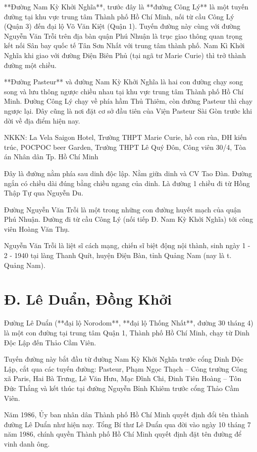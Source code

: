 **Đường Nam Kỳ Khởi Nghĩa**, trước đây là **đường Công Lý** là một tuyến đường tại khu vực trung tâm Thành phố Hồ Chí Minh, nối từ cầu Công Lý (Quận 3) đến đại lộ Võ Văn Kiệt (Quận 1). Tuyến đường này cùng với đường Nguyễn Văn Trỗi trên địa bàn quận Phú Nhuận là trục giao thông quan trọng kết nối Sân bay quốc tế Tân Sơn Nhất với trung tâm thành phố. Nam Kì Khởi Nghĩa khi giao với đường Điện Biên Phủ (tại ngã tư Marie Curie) thì trở thành đường một chiều.

**Đường Pasteur** và đường Nam Kỳ Khởi Nghĩa là hai con đường chạy song song và lưu thông ngược chiều nhau tại khu vực trung tâm Thành phố Hồ Chí Minh. Đường Công Lý chạy về phía hầm Thủ Thiêm, còn đường Pasteur thì chạy ngược lại. Đây cũng là nơi đặt cơ sở đầu tiên của Viện Pasteur Sài Gòn trước khi dời về địa điểm hiện nay.

NKKN: La Vela Saigon Hotel, Trường THPT Marie Curie, hồ con rùa, ĐH kiến trúc, POCPOC beer Garden, Trường THPT Lê Quý Đôn, Công viên 30/4, Tòa án Nhân dân Tp. Hồ Chí Minh

Đây là đường nằm phía sau dinh độc lập. Nằm giữa dinh và CV Tao Đàn. Đường ngắn có chiều dài đúng bằng chiều ngang của dinh. Là đường 1 chiều đi từ Hồng Thập Tự qua Nguyễn Du.

Đường Nguyễn Văn Trỗi là một trong những con đường huyết mạch của quận Phú Nhuận. Đường đi từ cầu Công Lý (nối tiếp Đ. Nam Kỳ Khởi Nghĩa) tới công viên Hoàng Văn Thụ.

Nguyễn Văn Trỗi là liệt sĩ cách mạng, chiến sĩ biệt động nội thành, sinh ngày 1 - 2 - 1940 tại làng Thanh Quít, huyện Điện Bàn, tỉnh Quảng Nam (nay là t. Quảng Nam).

\section{Đ. Lê Duẩn, Đồng Khởi}

Đường Lê Duẩn (**đại lộ Norodom**, **đại lộ Thống Nhất**, đường 30 tháng 4) là một con đường tại trung tâm Quận 1, Thành phố Hồ Chí Minh, chạy từ Dinh Độc Lập đến Thảo Cầm Viên.

Tuyến đường này bắt đầu từ đường Nam Kỳ Khởi Nghĩa trước cổng Dinh Độc Lập, cắt qua các tuyến đường: Pasteur, Phạm Ngọc Thạch – Công trường Công xã Paris, Hai Bà Trưng, Lê Văn Hưu, Mạc Đĩnh Chi, Đinh Tiên Hoàng – Tôn Đức Thắng và kết thúc tại đường Nguyễn Bỉnh Khiêm trước cổng Thảo Cầm Viên.

Năm 1986, Ủy ban nhân dân Thành phố Hồ Chí Minh quyết định đổi tên thành đường Lê Duẩn như hiện nay. Tổng Bí thư Lê Duẩn qua đời vào ngày 10 tháng 7 năm 1986, chính quyền Thành phố Hồ Chí Minh quyết định đặt tên đường để vinh danh ông.


